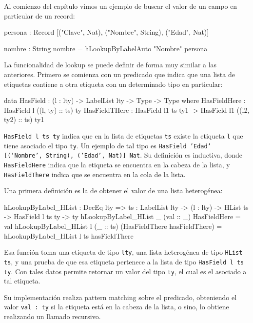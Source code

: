 Al comienzo del capítulo vimos un ejemplo de buscar el valor de un campo en particular de un record:

\begin{code}
persona : Record [("Clave", Nat), ("Nombre", String),
  ("Edad", Nat)]

nombre : String
nombre = hLookupByLabelAuto "Nombre" persona
\end{code}

La funcionalidad de lookup se puede definir de forma muy similar a las anteriores. Primero se comienza con un predicado que indica que una lista de etiquetas contiene a otra etiqueta con un determinado tipo en particular:

\begin{code}
data HasField : (l : lty) -> LabelList lty ->
  Type -> Type where
  HasFieldHere : HasField l ((l, ty) :: ts) ty
  HasFieldTHere : HasField l1 ts ty1 ->
    HasField l1 ((l2, ty2) :: ts) ty1
\end{code}

\texttt{HasField l ts ty} indica que en la lista de etiquetas \texttt{ts} existe la etiqueta \texttt{l} que tiene asociado el tipo \texttt{ty}. Un ejemplo de tal tipo es \texttt{HasField 'Edad' [('Nombre', String), ('Edad', Nat)] Nat}. Su definición es inductiva, donde \texttt{HasFieldHere} indica que la etiqueta se encuentra en la cabeza de la lista, y \texttt{HasFieldThere} indica que se encuentra en la cola de la lista.

Una primera definición es la de obtener el valor de una lista heterogénea:

\begin{code}
hLookupByLabel_HList : DecEq lty => {ts : LabelList lty} ->
  (l : lty) -> HList ts -> HasField l ts ty -> ty
hLookupByLabel_HList _ (val :: _) HasFieldHere = val
hLookupByLabel_HList l (_ :: ts) 
  (HasFieldThere hasFieldThere) =
  hLookupByLabel_HList l ts hasFieldThere
\end{code}

Esa función toma una etiqueta de tipo \texttt{lty}, una lista heterogénea de tipo \texttt{HList ts}, y una prueba de que esa etiqueta pertenece a la lista de tipo \texttt{HasField l ts ty}. Con tales datos permite retornar un valor del tipo \texttt{ty}, el cual es el asociado a tal etiqueta.

Su implementación realiza pattern matching sobre el predicado, obteniendo el valor \texttt{val : ty} si la etiqueta está en la cabeza de la lista, o sino, lo obtiene realizando un llamado recursivo.

